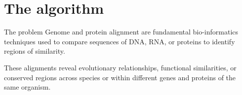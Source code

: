 

\section{The algorithm}


    \begin{frame}{The problem}
        Genome and protein alignment are fundamental bio-informatics techniques used to compare sequences of DNA, RNA, or proteins to identify regions of similarity.

        \vspace{10pt}
        
        These alignments reveal evolutionary relationships, functional similarities, or conserved regions across species or within different genes and proteins of the same organism.
    \end{frame}

    

